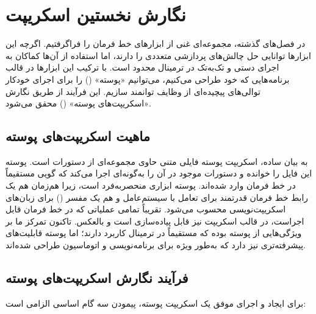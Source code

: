 \chapter{نگارش نخستین اسکریپت}

در فصل‌های گذشته، مجموعه‌ای غنی از ابزارهای خط فرمان را فراگرفتیم. اگرچه این ابزارها توانایی حل چالش‌های پردازشی متعددی را دارند، اما استفاده از آن‌ها کماکان به اجرای دستی و تک‌به‌تک در ترمینال محدود است. با ترکیب این ابزارها در قالب برنامه‌هایی که خود طراحی می‌کنیم، می‌توانیم «پوسته» () را برای اجرای خودکار توالی‌های پیچیده‌ای از وظایف توانمند سازیم. این فرآیند از طریق نگارش «اسکریپت‌های پوسته» () محقق می‌شود.

\section{ماهیت اسکریپت‌های پوسته}

به بیان ساده، اسکریپت پوسته فایلی متنی حاوی مجموعه‌ای از دستورات است. پوسته این فایل را خوانده و دستورات موجود در آن را به‌گونه‌ای اجرا می‌کند که گویی مستقیماً در خط فرمان وارد شده‌اند. پوسته ابزاری منحصربه‌فرد است، زیرا هم‌زمان هم یک رابط خط فرمان قدرتمند برای تعامل با سیستم‌عامل و هم یک مفسر () برای زبان‌های اسکریپت‌نویسی محسوب می‌شود. تقریباً تمامی عملیاتی که در خط فرمان قابل اجراست، در قالب اسکریپت نیز قابل پیاده‌سازی است و بالعکس. تاکنون تمرکز ما بر ویژگی‌هایی از پوسته بوده که مستقیماً در ترمینال کاربرد دارند؛ اما پوسته قابلیت‌های پیشرفته‌تری نیز دارد که به‌طور ویژه برای برنامه‌نویسی و اتوماسیون طراحی شده‌اند.

\section{فرآیند نگارش اسکریپت‌های پوسته}

برای ایجاد و اجرای موفق یک اسکریپت پوسته، پیمودن سه گام اساسی الزامی است:

